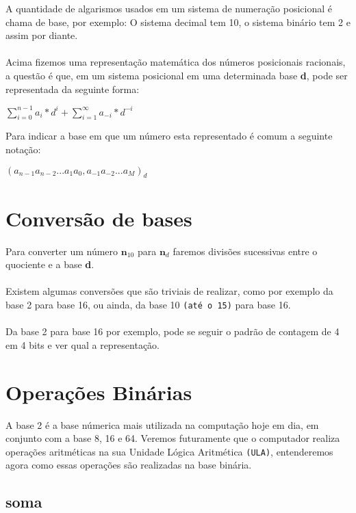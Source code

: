 \documentclass[12pt, onecolumn]{article}
\begin{document}
	A quantidade de algarismos usados em um sistema de numeração posicional é
	chama de base, por exemplo: O sistema decimal tem 10, o sistema binário tem 2 e 
	assim por diante.\\
	\\
	Acima fizemos uma representação matemática dos números posicionais 
	racionais, a questão é que, em um sistema posicional em uma determinada
	base \textbf{d}, pode ser representada da seguinte forma: 

	\begin{center}
		$\sum_{i=0}^{n-1} a_{i} * d^{i} + 
		\sum_{i=1}^{\infty} a_{-i} * d^{-i}$
	\end{center}

	Para indicar a base em que um número esta representado é comum a 
	seguinte notação:

	\begin{center}
		$(a_{n-1} a_{n-2} ... a_{1} a_{0}, a_{-1} a_{-2} ... a_{M})_d$
	\end{center}

			\section{\centering Conversão de bases}

	Para converter um número $\textbf{n}_{10}$ para $\textbf{n}_{d}$ faremos
	divisões sucessivas entre o quociente e a base \textbf{d}.\\
	\\
	Existem algumas conversões que são triviais de realizar, como por exemplo
	da base 2 para base 16, ou ainda, da base 10 \texttt{(até o 15)} 
	para base 16.\\
	\\
	Da base 2 para base 16 por exemplo, pode se seguir o padrão de contagem 
	de 4 em 4 bits e ver qual a representação.
	
			\section{\centering Operações Binárias}

	A base 2 é a base númerica mais utilizada na computação hoje em dia, em conjunto
	com a base 8, 16 e 64. Veremos futuramente que o computador realiza operações
	aritméticas na sua Unidade Lógica Aritmética \texttt{(ULA)}, entenderemos
	agora como essas operações são realizadas na base binária.

			\subsection{\centering soma}
\end{document}
